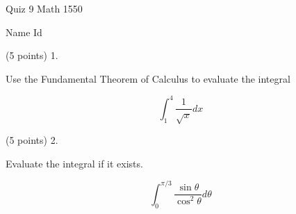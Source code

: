\documentclass{article}
\begin{document}
\begin{large}
\begin{bf}
\hspace{1.5in}
\parbox{1in}{Quiz 9 \newline Math 1550}
\hspace{1in}
\parbox{1in}{ Name \newline Id}
\end{bf}
\end{large}

 \vspace{0.3in}

(5 points) 1. \parbox[t]{4in}{Use the Fundamental Theorem of Calculus to evaluate the integral} 
$$\int_1^4 \frac{1}{\sqrt{x}}dx $$

\vspace{3.950in}  
(5 points) 2. \parbox[t]{4in}{Evaluate the integral if it exists.}
$$
\int_0^{\pi/3}\frac{\sin\theta}{\cos^2\theta }d\theta$$
\end{document}
